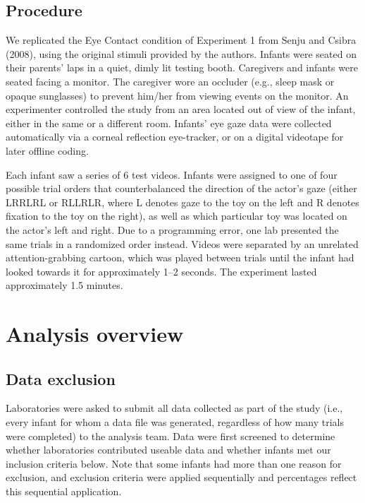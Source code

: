 \documentclass[
  english,
  ,man,floatsintext]{apa6}
\begin{document}
\hypertarget{procedure}{%
\subsection{Procedure}\label{procedure}}

We replicated the Eye Contact condition of Experiment 1 from Senju and Csibra (2008), using the original stimuli provided by the authors. Infants were seated on their parents' laps in a quiet, dimly lit testing booth. Caregivers and infants were seated facing a monitor. The caregiver wore an occluder (e.g., sleep mask or opaque sunglasses) to prevent him/her from viewing events on the monitor. An experimenter controlled the study from an area located out of view of the infant, either in the same or a different room. Infants' eye gaze data were collected automatically via a corneal reflection eye-tracker, or on a digital videotape for later offline coding.

Each infant saw a series of 6 test videos. Infants were assigned to one of four possible trial orders that counterbalanced the direction of the actor's gaze (either LRRLRL or RLLRLR, where L denotes gaze to the toy on the left and R denotes fixation to the toy on the right), as well as which particular toy was located on the actor's left and right. Due to a programming error, one lab presented the same trials in a randomized order instead. Videos were separated by an unrelated attention-grabbing cartoon, which was played between trials until the infant had looked towards it for approximately 1--2 seconds. The experiment lasted approximately 1.5 minutes.

\hypertarget{analysis-overview}{%
\section{Analysis overview}\label{analysis-overview}}

\hypertarget{data-exclusion}{%
\subsection{Data exclusion}\label{data-exclusion}}

Laboratories were asked to submit all data collected as part of the study (i.e., every infant for whom a data file was generated, regardless of how many trials were completed) to the analysis team. Data were first screened to determine whether laboratories contributed useable data and whether infants met our inclusion criteria below. Note that some infants had more than one reason for exclusion, and exclusion criteria were applied sequentially and percentages reflect this sequential application.
\end{document}

